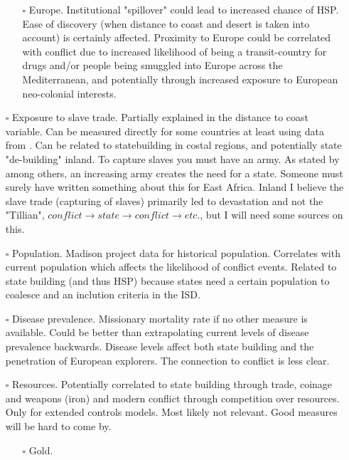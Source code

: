 \documentclass[12pt]{article}
\begin{document}
\begin{itemize}
\begin{itemize}
		\item[$\square$] Europe. Institutional "spillover" could lead to
			increased chance of HSP. Ease of discovery (when
			distance to coast and desert is taken into account) is
			certainly affected. Proximity to Europe could be
			correlated with conflict due to increased likelihood of
			being a transit-country for drugs and/or people being
			smuggled into Europe across the Mediterranean, and
			potentially through increased exposure to European
			neo-colonial interests. 
	\end{itemize}

	\item[$\square$] Exposure to slave trade. Partially explained in the
		distance to coast variable. Can be measured directly for some
		countries at least using data from \citet{Nunn2008}. Can be
		related to statebuilding in costal regions, and potentially
		state "de-building" inland. To capture slaves you must have an
		army. As stated by \citet{Tilly1990} among others, an increasing
		army creates the need for a state. Someone must surely have
		written something about this for East Africa. Inland I believe
		the slave trade (capturing of slaves) primarily led to
		devastation and not the "Tillian", $conflict \rightarrow state
		\rightarrow conflict \rightarrow etc.$, but I will need some sources
		on this.

	\item[$\square$] Population. Madison project data for historical
		population. Correlates with current population which affects the
		likelihood of conflict events. Related to state building (and
		thus HSP) because states need a certain population to coalesce
		and an inclution criteria in the ISD.

	\item[$\square$] Disease prevalence. Missionary mortality rate if no
		other measure is available. Could be better than extrapolating
		current levels of disease prevalence backwards. Disease levels 
		affect both state building and the penetration of
		European explorers. The connection to conflict is less clear.

	\item[$\square$] Resources. Potentially correlated to state building
		through trade, coinage and weapons (iron) and modern conflict
		through competition over resources. Only for extended controls
		models. Most likely not relevant. Good measures will be hard to
		come by.
	\begin{itemize}
		\item[$\square$] Gold.


\end{itemize}
\end{itemize}
\end{document}

